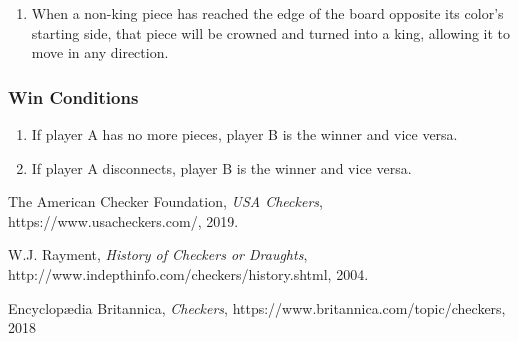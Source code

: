 \documentclass[10pt]{article}
\begin{document}
\begin{enumerate}[label*=G\arabic*.]
\item When a non-king piece has reached the edge of the board opposite its color’s starting side, that piece will be crowned and turned into a king, allowing it to move in any direction.
\end{enumerate}
\subsubsection{Win Conditions}

\begin{enumerate}
    \item If player A has no more pieces, player B is the winner and vice versa.
    \item If player A disconnects, player B is the winner and vice versa.
\end{enumerate}


\begin{thebibliography}{9}

  The American Checker Foundation,
  \textit{USA Checkers},
  https://www.usacheckers.com/,
  2019.

W.J. Rayment,
\textit{History of Checkers or Draughts},
http://www.indepthinfo.com/checkers/history.shtml,
2004.

Encyclopædia Britannica,
\textit{Checkers},
https://www.britannica.com/topic/checkers,
2018
\end{thebibliography}
\end{document}
